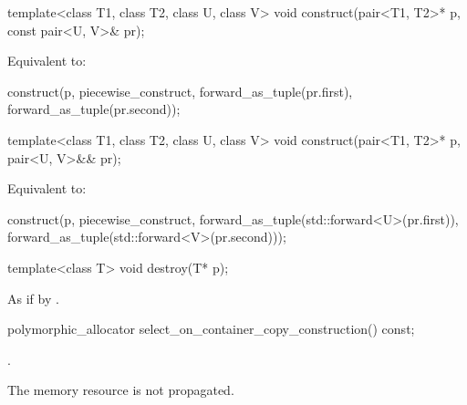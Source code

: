 %
\begin{itemdecl}
template<class T1, class T2, class U, class V>
  void construct(pair<T1, T2>* p, const pair<U, V>& pr);
\end{itemdecl}

\begin{itemdescr}
\pnum
\effects
Equivalent to:
\begin{codeblock}
construct(p, piecewise_construct,
          forward_as_tuple(pr.first),
          forward_as_tuple(pr.second));
\end{codeblock}
\end{itemdescr}

%
\begin{itemdecl}
template<class T1, class T2, class U, class V>
  void construct(pair<T1, T2>* p, pair<U, V>&& pr);
\end{itemdecl}

\begin{itemdescr}
\pnum
\effects
Equivalent to:
\begin{codeblock}
construct(p, piecewise_construct,
          forward_as_tuple(std::forward<U>(pr.first)),
          forward_as_tuple(std::forward<V>(pr.second)));
\end{codeblock}
\end{itemdescr}

%
\begin{itemdecl}
template<class T>
  void destroy(T* p);
\end{itemdecl}

\begin{itemdescr}
\pnum
\effects
As if by .
\end{itemdescr}

%
\begin{itemdecl}
polymorphic_allocator select_on_container_copy_construction() const;
\end{itemdecl}

\begin{itemdescr}
\pnum
\returns
{}.

\pnum
\begin{note}
The memory resource is not propagated.
\end{note}
\end{itemdescr}

